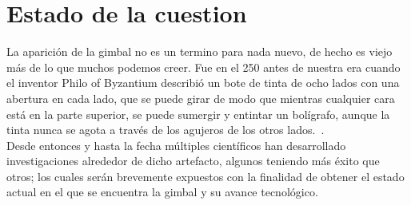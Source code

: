 \section{Estado de la cuestion}
La aparición de la gimbal no es un termino para nada nuevo, de hecho es viejo más de lo que
muchos podemos creer. Fue en el 250 antes de nuestra era cuando el inventor Philo of Byzantium
describió un bote de tinta de ocho lados con una abertura en cada lado, que se puede
girar de modo que mientras cualquier cara está en la parte superior, se puede sumergir y
entintar un bolígrafo, aunque la tinta nunca se agota a través de los agujeros de los otros
lados.~\cite{Gimbal}.\\
Desde entonces y hasta la fecha múltiples científicos han desarrollado investigaciones alrededor
de dicho artefacto, algunos teniendo más éxito que otros; los cuales serán brevemente expuestos
con la finalidad de obtener el estado actual en el que se encuentra la gimbal y su avance
tecnológico.
